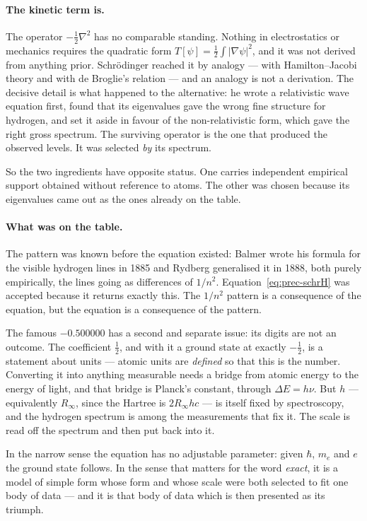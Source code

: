 \paragraph{The kinetic term is.}
The operator $-\tfrac12\nabla^2$ has no comparable standing. Nothing in electrostatics or mechanics
requires the quadratic form $T[\psi] = \tfrac12\int|\nabla\psi|^2$, and it was not derived from
anything prior. Schr\"odinger reached it by analogy --- with Hamilton--Jacobi theory and with de
Broglie's relation --- and an analogy is not a derivation. The decisive detail is what happened to
the alternative: he wrote a relativistic wave equation first, found that its eigenvalues gave the
wrong fine structure for hydrogen, and set it aside in favour of the non-relativistic form, which
gave the right gross spectrum. The surviving operator is the one that produced the observed levels.
It was selected \emph{by} its spectrum.

So the two ingredients have opposite status. One carries independent empirical support obtained
without reference to atoms. The other was chosen because its eigenvalues came out as the ones
already on the table.

\paragraph{What was on the table.}
The pattern was known before the equation existed: Balmer wrote his formula for the visible
hydrogen lines in 1885 and Rydberg generalised it in 1888, both purely empirically, the lines going
as differences of $1/n^2$. Equation~\eqref{eq:prec-schrH} was accepted because it returns exactly
this. The $1/n^2$ pattern is a consequence of the equation, but the equation is a consequence of
the pattern.

The famous $-0.500000$ has a second and separate issue: its digits are not an outcome. The
coefficient $\tfrac12$, and with it a ground state at exactly $-\tfrac12$, is a statement about
units --- atomic units are \emph{defined} so that this is the number. Converting it into anything
measurable needs a bridge from atomic energy to the energy of light, and that bridge is Planck's
constant, through $\Delta E = h\nu$. But $h$ --- equivalently $R_\infty$, since the Hartree is
$2R_\infty h c$ --- is itself fixed by spectroscopy, and the hydrogen spectrum is among the
measurements that fix it. The scale is read off the spectrum and then put back into it.

In the narrow sense the equation has no adjustable parameter: given $\hbar$, $m_e$ and $e$ the
ground state follows. In the sense that matters for the word \emph{exact}, it is a model of simple
form whose form and whose scale were both selected to fit one body of data --- and it is that body
of data which is then presented as its triumph.

